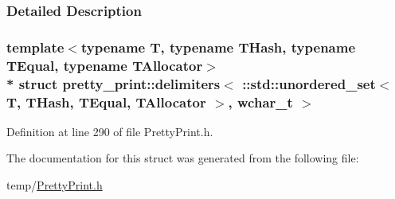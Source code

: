 \subsubsection{Detailed Description}
\subsubsection*{template$<$typename T, typename T\+Hash, typename T\+Equal, typename T\+Allocator$>$\\*
struct pretty\+\_\+print\+::delimiters$<$ \+::std\+::unordered\+\_\+set$<$ T, T\+Hash, T\+Equal, T\+Allocator $>$, wchar\+\_\+t $>$}



Definition at line 290 of file Pretty\+Print.\+h.



The documentation for this struct was generated from the following file\+:\begin{DoxyCompactItemize}
\item 
temp/\hyperlink{PrettyPrint_8h}{Pretty\+Print.\+h}\end{DoxyCompactItemize}
